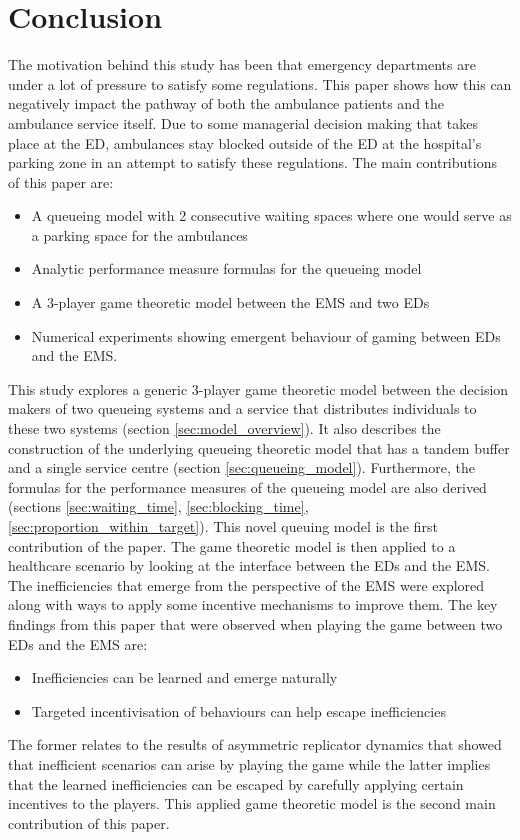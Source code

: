 \section{Conclusion}

The motivation behind this study has been that emergency departments are
under a lot of pressure to satisfy some regulations.
This paper shows how this can negatively impact the pathway of both the
ambulance patients and the ambulance service itself.
Due to some managerial decision making that takes place at the ED, ambulances
stay blocked outside of the ED at the hospital's parking zone in an attempt
to satisfy these regulations.
The main contributions of this paper are:
\begin{itemize}
    \item A queueing model with 2 consecutive waiting spaces where one would
    serve as a parking space for the ambulances
    \item Analytic performance measure formulas for the queueing model
    \item A 3-player game theoretic model between the EMS and two EDs
    \item Numerical experiments showing emergent behaviour of gaming between
    EDs and the EMS.
\end{itemize}

This study explores a generic 3-player game theoretic model between the
decision makers of two queueing systems and a service that distributes
individuals to these two systems (section \ref{sec:model_overview}).
It also describes the construction of the underlying queueing theoretic model
that has a tandem buffer and a single service centre (section
\ref{sec:queueing_model}).
Furthermore, the formulas for the performance measures of the queueing model
are also derived (sections \ref{sec:waiting_time}, \ref{sec:blocking_time},
\ref{sec:proportion_within_target}).
This novel queuing model is the first contribution of the paper.
The game theoretic model is then applied to a healthcare scenario by looking at
the interface between the EDs and the EMS.
The inefficiencies that emerge from the perspective of the EMS were explored
along with ways to apply some incentive mechanisms to improve them.
The key findings from this paper that were observed when playing the game
between two EDs and the EMS are:
\begin{itemize}
    \item Inefficiencies can be learned and emerge naturally
    \item Targeted incentivisation of behaviours can help escape inefficiencies
\end{itemize}
The former relates to the results of asymmetric replicator dynamics that showed
that inefficient scenarios can arise by playing the game while the latter
implies that the learned inefficiencies can be escaped by carefully applying
certain incentives to the players.
This applied game theoretic model is the second main contribution of this paper.

